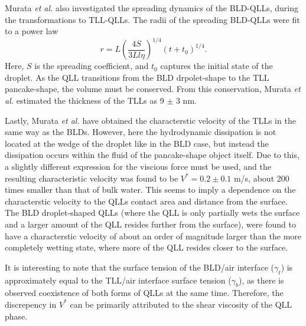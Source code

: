 Murata \textit{et al.} also investigated the spreading dynamics of the
BLD-QLLs, during the transformations to TLL-QLLs. The radii of the
spreading BLD-QLLs were fit to a power law
\begin{equation}
r = L (\frac{4S}{3Ll \eta})^{1/4}(t+t_0)^{1/4}.
\end{equation}
Here, $S$ is the spreading coefficient, and $t_0$ captures the initial
state of the droplet. As the QLL transitions from the BLD
drpolet-shape to the TLL pancake-shape, the volume must be
conserved. From this conservation, Murata \textit{et al.} estimated
the thickness of the TLLs as 9 $\pm$ 3 nm.

Lastly, Murata \textit{et al.} have obtained the characterstic
velocity of the TLLs in the same way as the BLDs. However, here the
hydrodynamic dissipation is not located at the wedge of the droplet
like in the BLD case, but instead the dissipation occurs within the
fluid of the pancake-shape object itself. Due to this, a slightly
different expression for the viscious force must be used, and the
resulting characteristic velocity was found to be $V^* = 0.2 \pm 0.1$
m/s, about 200 times smaller than that of bulk water. This seems to
imply a dependence on the characterstic velocity to the QLLs contact
area and distance from the surface. The BLD droplet-shaped QLLs (where
the QLL is only partially wets the surface and a larger amount of the
QLL resides further from the surface), were found to have a
characterstic velocity of about an order of magnitude larger than the
more completely wetting state, where more of the QLL resides closer to
the surface.

It is interesting to note that the surface tension of the BLD/air
interface ($\gamma_t$) is approximately equal to the TLL/air interface
surface tension ($\gamma_b$), as there is observed coexistence of both
forms of QLLs at the same time. Therefore, the discrepency in $V^*$
can be primarily attributed to the shear viscosity of the QLL phase.




%

